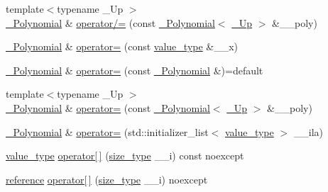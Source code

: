 \begin{DoxyCompactItemize}
\item 
{\footnotesize template$<$typename \+\_\+\+Up $>$ }\\\hyperlink{class____gnu__cxx_1_1__Polynomial}{\+\_\+\+Polynomial} \& \hyperlink{class____gnu__cxx_1_1__Polynomial_a3374e3ab44ed1478de27f688aae6c3f1}{operator/=} (const \hyperlink{class____gnu__cxx_1_1__Polynomial}{\+\_\+\+Polynomial}$<$ \hyperlink{class____gnu__cxx_1_1__Polynomial_a242114d4b86648a5dff67a8221f80d40}{\+\_\+\+Up} $>$ \&\+\_\+\+\_\+poly)
\item 
\hyperlink{class____gnu__cxx_1_1__Polynomial}{\+\_\+\+Polynomial} \& \hyperlink{class____gnu__cxx_1_1__Polynomial_a207a09b3f170adcfbf21c26821c864dd}{operator=} (const \hyperlink{class____gnu__cxx_1_1__Polynomial_a725563351f50e76084a7a016c06f8a53}{value\+\_\+type} \&\+\_\+\+\_\+x)
\item 
\hyperlink{class____gnu__cxx_1_1__Polynomial}{\+\_\+\+Polynomial} \& \hyperlink{class____gnu__cxx_1_1__Polynomial_a96aa1f47da636376d63cf099558113b8}{operator=} (const \hyperlink{class____gnu__cxx_1_1__Polynomial}{\+\_\+\+Polynomial} \&)=default
\item 
{\footnotesize template$<$typename \+\_\+\+Up $>$ }\\\hyperlink{class____gnu__cxx_1_1__Polynomial}{\+\_\+\+Polynomial} \& \hyperlink{class____gnu__cxx_1_1__Polynomial_ab3287f4f0300adc76216e7fabeb62d7d}{operator=} (const \hyperlink{class____gnu__cxx_1_1__Polynomial}{\+\_\+\+Polynomial}$<$ \hyperlink{class____gnu__cxx_1_1__Polynomial_a242114d4b86648a5dff67a8221f80d40}{\+\_\+\+Up} $>$ \&\+\_\+\+\_\+poly)
\item 
\hyperlink{class____gnu__cxx_1_1__Polynomial}{\+\_\+\+Polynomial} \& \hyperlink{class____gnu__cxx_1_1__Polynomial_a44394532a2b1e67f1613b35402da9d47}{operator=} (std\+::initializer\+\_\+list$<$ \hyperlink{class____gnu__cxx_1_1__Polynomial_a725563351f50e76084a7a016c06f8a53}{value\+\_\+type} $>$ \+\_\+\+\_\+ila)
\item 
\hyperlink{class____gnu__cxx_1_1__Polynomial_a725563351f50e76084a7a016c06f8a53}{value\+\_\+type} \hyperlink{class____gnu__cxx_1_1__Polynomial_adda717f35cc87205daf0ea7a16d5d1a7}{operator\mbox{[}$\,$\mbox{]}} (\hyperlink{class____gnu__cxx_1_1__Polynomial_a8b25fcfd4acaad0c5c08b649c22da28a}{size\+\_\+type} \+\_\+\+\_\+i) const noexcept
\item 
\hyperlink{class____gnu__cxx_1_1__Polynomial_accb3b4df60e4ad82d466173d54ea731a}{reference} \hyperlink{class____gnu__cxx_1_1__Polynomial_a999ee3c5a82fe4b2fa39b7a237ff2cbf}{operator\mbox{[}$\,$\mbox{]}} (\hyperlink{class____gnu__cxx_1_1__Polynomial_a8b25fcfd4acaad0c5c08b649c22da28a}{size\+\_\+type} \+\_\+\+\_\+i) noexcept

\end{DoxyCompactItemize}
